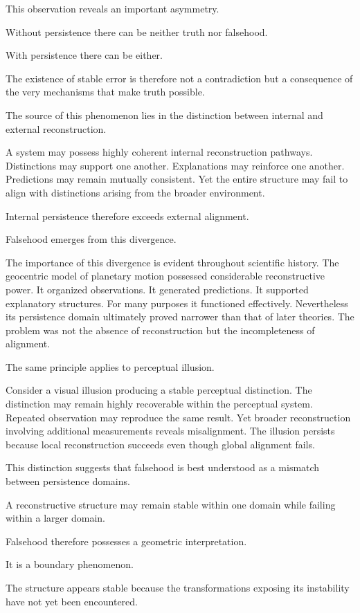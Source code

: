 \documentclass[12pt,oneside]{article}
\theoremstyle{definition}
\begin{document}
This observation reveals an important asymmetry.

Without persistence there can be neither truth nor falsehood.

With persistence there can be either.

The existence of stable error is therefore not a contradiction but a consequence of the very mechanisms that make truth possible.

The source of this phenomenon lies in the distinction between internal and external reconstruction.

A system may possess highly coherent internal reconstruction pathways. Distinctions may support one another. Explanations may reinforce one another. Predictions may remain mutually consistent. Yet the entire structure may fail to align with distinctions arising from the broader environment.

Internal persistence therefore exceeds external alignment.

Falsehood emerges from this divergence.

The importance of this divergence is evident throughout scientific history. The geocentric model of planetary motion possessed considerable reconstructive power. It organized observations. It generated predictions. It supported explanatory structures. For many purposes it functioned effectively. Nevertheless its persistence domain ultimately proved narrower than that of later theories. The problem was not the absence of reconstruction but the incompleteness of alignment.

The same principle applies to perceptual illusion.

Consider a visual illusion producing a stable perceptual distinction. The distinction may remain highly recoverable within the perceptual system. Repeated observation may reproduce the same result. Yet broader reconstruction involving additional measurements reveals misalignment. The illusion persists because local reconstruction succeeds even though global alignment fails.

This distinction suggests that falsehood is best understood as a mismatch between persistence domains.

A reconstructive structure may remain stable within one domain while failing within a larger domain.

Falsehood therefore possesses a geometric interpretation.

It is a boundary phenomenon.

The structure appears stable because the transformations exposing its instability have not yet been encountered.
\end{document}
